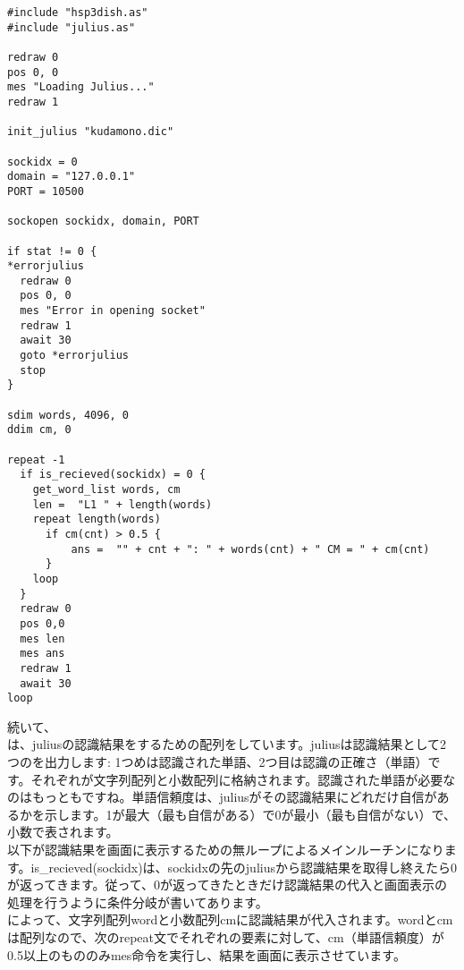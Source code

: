 \begin{lstlisting}[caption=julius.hsp,label=julius.hsp]
#include "hsp3dish.as"
#include "julius.as"

redraw 0
pos 0, 0
mes "Loading Julius..."
redraw 1

init_julius "kudamono.dic"

sockidx = 0
domain = "127.0.0.1"
PORT = 10500

sockopen sockidx, domain, PORT

if stat != 0 {
*errorjulius
  redraw 0
  pos 0, 0
  mes "Error in opening socket"
  redraw 1
  await 30
  goto *errorjulius
  stop
}

sdim words, 4096, 0
ddim cm, 0

repeat -1
  if is_recieved(sockidx) = 0 {
    get_word_list words, cm
    len =  "L1 " + length(words)
    repeat length(words)
      if cm(cnt) > 0.5 {
          ans =  "" + cnt + ": " + words(cnt) + " CM = " + cm(cnt)
      }
    loop
  }
  redraw 0
  pos 0,0
  mes len
  mes ans
  redraw 1
  await 30
loop
\end{lstlisting}

続いて、\\
は、juliusの認識結果をするための配列をしています。juliusは認識結果として2つのを出力します: 1つめは認識された単語、2つ目は認識の正確さ（単語）です。それぞれが文字列配列と小数配列に格納されます。認識された単語が必要なのはもっともですね。単語信頼度は、juliusがその認識結果にどれだけ自信があるかを示します。1が最大（最も自信がある）で0が最小（最も自信がない）で、小数で表されます。\\
以下が認識結果を画面に表示するための無ループによるメインルーチンになります。is\_recieved(sockidx)は、sockidxの先のjuliusから認識結果を取得し終えたら0が返ってきます。従って、0が返ってきたときだけ認識結果の代入と画面表示の処理を行うように条件分岐が書いてあります。\\
によって、文字列配列wordと小数配列cmに認識結果が代入されます。wordとcmは配列なので、次のrepeat文でそれぞれの要素に対して、cm（単語信頼度）が0.5以上のもののみmes命令を実行し、結果を画面に表示させています。\\
\begin{tcolorbox}[title=\useOmetoi]
\begin{enumerate}
\end{enumerate}
\end{tcolorbox}
